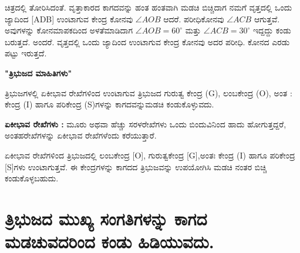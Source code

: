  ಚಿತ್ರದಲ್ಲಿ ತೋರಿಸಿದಂತೆ. ವೃತ್ತಾಕಾರದ ಕಾಗದವನ್ನು ಹಂತ ಹಂತವಾಗಿ ಮಡಚಿ ಬಿಚ್ಚಿ\break ದಾಗ ನಮಗೆ ವೃತ್ತದಲ್ಲಿ ಒಂದು ಜ್ಯಾದಿಂದ [ADB] ಉಂಟಾಗುವ ಕೇಂದ್ರ ಕೋನವು $\angle AOB$  ಆದರೆ. ಪರೀಧಿಕೋನವು $\angle ACB$ ಆಗುತ್ತವೆ. ಅವುಗಳನ್ನು ಕೋನಮಾಪಕದಿಂದ ಅಳತೆಮಾಡಿದಾಗ $\angle AOB = 60^\circ$ ಮತ್ತು $\angle ACB = 30^\circ$ ಇದ್ದದ್ದು ಕಂಡು ಬರುತ್ತದೆ. ಅಂದರೆ. ವೃತ್ತದಲ್ಲಿ ಒಂದು ಜ್ಯಾದಿಂದ ಉಂಟಾಗುವ ಕೇಂದ್ರ ಕೋನವು ಅದರ ಪರೀಧಿ. ಕೋನದ ಎರಡು ಪಟ್ಟು ಇರುತ್ತದೆ. 
 
 \smallskip
 \noindent
  \textbf{"ತ್ರಿಭುಜದ ಮಾಹಿತಿಗಳು"}
  
  ತ್ರಿಭುಜಗಳಲ್ಲಿ ಏಕೀಭಾವ ರೇಖೆಗಳಿಂದ ಉಂಟಾಗುವ ತ್ರಿಭುಜದ ಗುರುತ್ವ ಕೇಂದ್ರ (G), ಲಂಬಕೇಂದ್ರ  (O), ಅಂತ : ಕೇಂದ್ರ (I) ಹಾಗೂ  ಪರಿಕೇಂದ್ರ (S)ಗಳನ್ನು ಕಾಗದವನ್ನು\break ಮಡಚಿ ಕಂಡುಕೊಳ್ಳುವದು. 
  
  \noindent
    \textbf{ಏಕೀಭಾವ ರೇಖೆಗಳು :} ಮೂರು ಅಥವಾ ಹೆಚ್ಚು ಸರಳರೇಖೆಗಳು ಒಂದು ಬಿಂದುವಿನಿಂದ ಹಾದು ಹೋಗುತ್ತದ್ದರೆ, ಅಂತಹರೇಖೆಗಳನ್ನು ಏಕೀಭಾವ ರೇಖೆಗಳೆಂದು ಕರೆಯುತ್ತಾರೆ. 
    
    ಏಕೀಭಾವ ರೇಖೆಗಳಿಂದ ತ್ರಿಭುಜದಲ್ಲಿ ಲಂಬಕೇಂದ್ರ [O], ಗುರುತ್ವಕೇಂದ್ರ  [G],\break ಅಂತಃ ಕೇಂದ್ರ  (I) ಹಾಗೂ ಪರಿಕೇಂದ್ರ [S]ಗಳು ಉಂಟಾಗುತ್ತವೆ. ಈ ಕೇಂದ್ರಗಳನ್ನು ಕಾಗದದ ತ್ರಿಭುಜವನ್ನು ಉಪಯೋಗಿಸಿ ಮಡಚಿ ನಂತರ ಬಿಚ್ಚಿ ಕಂಡುಕೊಳ್ಳಬಹುದು. 

\section{ತ್ರಿಭುಜದ ಮುಖ್ಯ ಸಂಗತಿಗಳನ್ನು ಕಾಗದ ಮಡಚುವದರಿಂದ ಕಂಡು ಹಿಡಿಯುವದು. }\label{sec1.13}%
      

